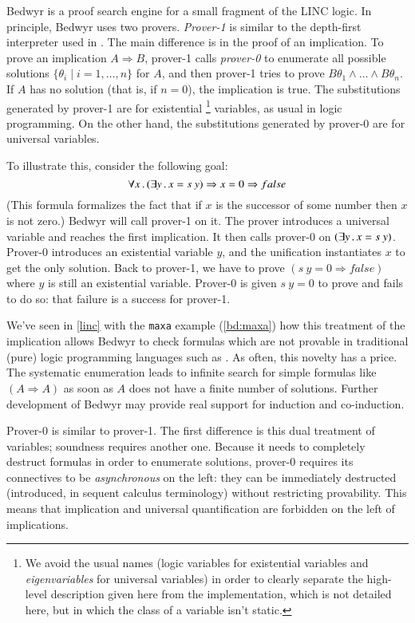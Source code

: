 Bedwyr is a proof search engine for a small fragment of the LINC logic.
In principle, Bedwyr uses two provers.  \emph{Prover-1} is similar to
the depth-first interpreter used in \lp{}.  The main difference is in
the proof of an implication.  To prove an implication $A\Rightarrow B$,
prover-1  calls \emph{prover-0} to enumerate all possible solutions
$\{\theta_i\;|\;i=1,\ldots,n\}$ for $A$, and then prover-1 tries to
prove $B\theta_1\wedge\dots\wedge B\theta_n$.  If $A$ has no solution
(that is, if $n=0$), the implication is true.  The substitutions
generated by prover-1 are for existential%
\footnote{We avoid the usual names (logic variables for existential
  variables and \emph{eigenvariables} for universal variables) in order
  to clearly separate the high-level description given here from the
  implementation, which is not detailed here, but in which the class of
  a variable isn't static.
} variables, as usual in logic programming.  On the other hand, the
substitutions generated by prover-0 are for universal variables.

To illustrate this, consider the following goal:
\[\forall x\, .\, (\exists y\, .\, x=s~y) \Rightarrow x=0 \Rightarrow false\]
(This formula formalizes the fact that if $x$ is the successor of some
number then $x$ is not zero.) Bedwyr will call prover-1 on it. The
prover introduces a universal variable and reaches the first
implication.  It then calls prover-0 on $(\exists y \, .\, x = s~y)$.
Prover-0 introduces an existential variable $y$, and the unification
instantiates $x$ to get the only solution.  Back to prover-1, we have to
prove $(s~y = 0 \Rightarrow false)$ where $y$ is still an existential
variable. Prover-0 is given $s~y=0$ to prove and fails to do so: that
failure is a success for prover-1.

We've seen in \autoref{linc} with the \texttt{maxa} example
(\autoref{bd:maxa}) how this treatment of the implication allows Bedwyr
to check formulas which are not provable in traditional (pure) logic
programming languages such as \lp{}.  As often, this novelty has a
price.  The systematic enumeration leads to infinite search for simple
formulas like $(A \Rightarrow A)$ as soon as $A$ does not have a finite
number of solutions.  Further development of Bedwyr may provide
real support for induction and co-induction.

Prover-0 is similar to prover-1.  The first difference is this dual
treatment of variables; soundness requires another one.  Because it
needs to completely destruct formulas in order to enumerate solutions,
prover-0 requires its connectives to be \emph{asynchronous} on the left:
they can be immediately destructed (introduced, in sequent calculus
terminology) without restricting provability.  This means that
implication and universal quantification are forbidden on the left of
implications.


